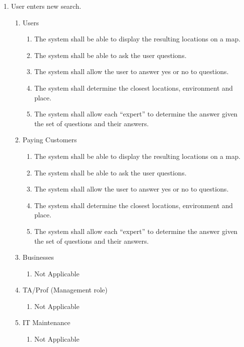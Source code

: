 \documentclass[titlepage]{article}
\begin{document}
		\begin{enumerate}[\textbf{{BE}1.}]
			\item User enters new search.
			\begin{enumerate}[\textbf{{VP1}.1}]
				
				\item Users
				\begin{enumerate}
					\item The system shall be able to display the resulting locations on a map.
					\item The system shall be able to ask the user questions.
					\item The system shall allow the user to answer yes or no to questions.
					\item The system shall determine the closest locations, environment and place.
					\item The system shall allow each “expert” to determine the answer given the set of questions and their answers.
				\end{enumerate}
				
				\item Paying Customers
				\begin{enumerate}
					\item The system shall be able to display the resulting locations on a map.
					\item The system shall be able to ask the user questions.
					\item The system shall allow the user to answer yes or no to questions.
					\item The system shall determine the closest locations, environment and place.
					\item The system shall allow each “expert” to determine the answer given the set of questions and their answers.
				\end{enumerate}
				
				\item Businesses
				\begin{enumerate}
					\item Not Applicable
				\end{enumerate}
				
				\item TA/Prof (Management role)
				\begin{enumerate}
					\item Not Applicable
				\end{enumerate}
				
				\item IT Maintenance
				\begin{enumerate}
					\item Not Applicable
				\end{enumerate}
				

\end{enumerate}
\end{enumerate}
\end{document}
